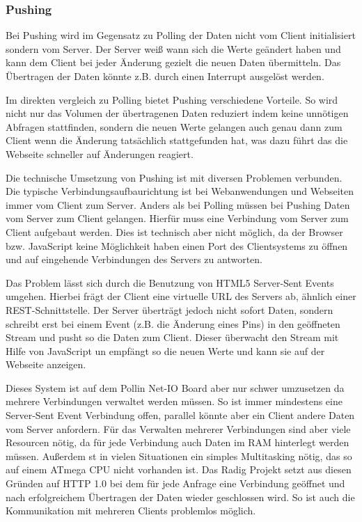\subsubsection{Pushing}
Bei Pushing wird im Gegensatz zu Polling der Daten nicht vom Client initialisiert sondern
vom Server. Der Server weiß wann sich die Werte geändert haben und kann dem Client bei
jeder Änderung gezielt die neuen Daten übermitteln. Das Übertragen der Daten
könnte z.B. durch einen Interrupt ausgelöst werden.

Im direkten vergleich zu Polling bietet Pushing verschiedene Vorteile. So wird nicht nur
das Volumen der übertragenen Daten reduziert indem keine unnötigen Abfragen stattfinden,
sondern die neuen Werte gelangen auch genau dann zum Client wenn die Änderung tatsächlich
stattgefunden hat, was dazu führt das die Webseite schneller auf Änderungen reagiert.

Die technische Umsetzung von Pushing ist mit diversen Problemen verbunden. Die typische
Verbindungsaufbaurichtung ist bei Webanwendungen und Webseiten immer vom Client zum
Server. Anders als bei Polling müssen bei Pushing Daten vom Server zum Client gelangen.
Hierfür muss eine Verbindung vom Server zum Client aufgebaut werden. Dies ist technisch
aber nicht möglich, da der Browser bzw. JavaScript keine Möglichkeit haben einen Port des
Clientsystems zu öffnen und auf eingehende Verbindungen des Servers zu antworten.

Das Problem lässt sich durch die Benutzung von HTML5 Server-Sent Events umgehen. Hierbei
frägt der Client eine virtuelle URL des Servers ab, ähnlich einer REST-Schnittstelle. Der
Server überträgt jedoch nicht sofort Daten, sondern schreibt erst bei einem Event (z.B.
die Änderung eines Pins) in den geöffneten Stream und pusht so die Daten zum Client.
Dieser überwacht den Stream mit Hilfe von JavaScript un empfängt so die neuen Werte und
kann sie auf der Webseite anzeigen.

Dieses System ist auf dem Pollin Net-IO Board aber nur schwer umzusetzen da mehrere
Verbindungen verwaltet werden müssen. So ist immer mindestens eine Server-Sent Event
Verbindung offen, parallel könnte aber ein Client andere Daten vom Server anfordern. Für
das Verwalten mehrerer Verbindungen sind aber viele Resourcen nötig, da für jede
Verbindung auch Daten im RAM hinterlegt werden müssen. Außerdem st in vielen Situationen
ein simples Multitasking nötig, das so auf einem ATmega CPU nicht vorhanden ist. Das Radig
Projekt setzt aus diesen Gründen auf HTTP 1.0 bei dem für jede Anfrage eine Verbindung
geöffnet und nach erfolgreichem Übertragen der Daten wieder geschlossen wird. So ist auch
die Kommunikation mit mehreren Clients problemlos möglich.


